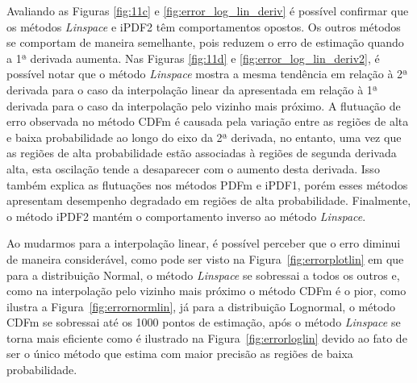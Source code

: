 Avaliando as Figuras \ref{fig:11c} e \ref{fig:error_log_lin_deriv} é possível confirmar que os métodos \textit{Linspace} e \ac{iPDF2} têm comportamentos opostos. Os outros métodos se comportam de maneira semelhante, pois reduzem o erro de estimação quando a 1ª derivada aumenta.
Nas Figuras \ref{fig:11d} e \ref{fig:error_log_lin_deriv2}, é possível notar que o método \textit{Linspace} mostra a mesma tendência em relação à 2ª derivada para o caso da interpolação linear da apresentada em relação à 1ª derivada para o caso da interpolação pelo vizinho mais próximo.
A flutuação de erro observada no método \ac{CDFm} é causada pela variação entre as regiões de alta e baixa probabilidade ao longo do eixo da 2ª derivada, no entanto, uma vez que as regiões de alta probabilidade estão associadas à regiões de segunda derivada alta, esta oscilação tende a desaparecer com o aumento desta derivada.
Isso também explica as flutuações nos métodos \ac{PDFm} e \ac{iPDF1}, porém esses métodos apresentam desempenho degradado em regiões de alta probabilidade. Finalmente, o método \ac{iPDF2} mantém o comportamento inverso ao método \textit{Linspace}.

Ao mudarmos para a interpolação linear, é possível perceber que o erro diminui de maneira considerável, como pode ser visto na Figura~\ref{fig:errorplotlin} em que para a distribuição Normal, o método \textit{Linspace} se sobressai a todos os outros e, como na interpolação pelo vizinho mais próximo o método \ac{CDFm} é o pior, como ilustra a Figura~\ref{fig:errornormlin}, já para a distribuição Lognormal, o método \ac{CDFm} se sobressai até os 1000 pontos de estimação, após o método \textit{Linspace} se torna mais eficiente como é ilustrado na Figura~\ref{fig:errorloglin} devido ao fato de ser o único método que estima com maior precisão as regiões de baixa probabilidade.


